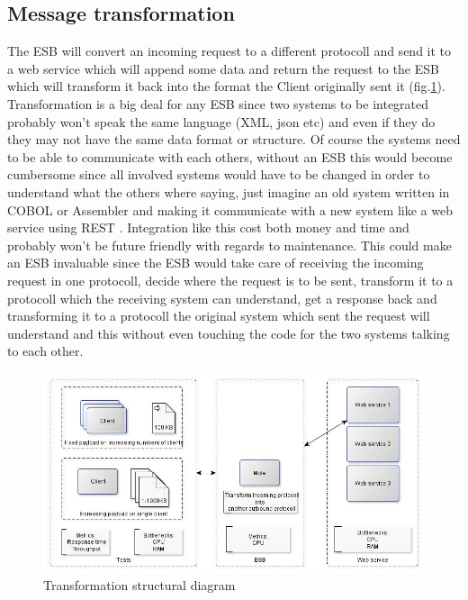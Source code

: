 \subsection{Message transformation}
The ESB will convert an incoming request to a different protocoll and send it to a web service which will append some data and return the request to the ESB which will transform it back into the format the Client originally sent it (fig.\ref{fig:transform-diagram}).
Transformation is a big deal for any ESB since two systems to be integrated probably won't speak the same language (XML, json etc) and even if they do they may not have the same data format or structure. Of course the systems need to be able to communicate with each others, without an ESB this would become cumbersome since all involved systems would have to be changed in order to understand what the others where saying, just imagine an old system written in COBOL or Assembler and making it communicate with a new system like a web service using REST \cite{whatisrest}. Integration like this cost both money and time and probably won't be future friendly with regards to maintenance.
This could make an ESB invaluable since the ESB would take care of receiving the incoming request in one protocoll, decide where the request is to be sent, transform it to a protocoll which the receiving system can understand, get a response back and transforming it to a protocoll the original system which sent the request will understand and this without even touching the code for the two systems talking to each other.

\begin{figure}[H]
	\centerline{\includegraphics[scale=0.43]{img/transformation}}
	\caption{Transformation structural diagram}
	\label{fig:transform-diagram}
\end{figure}

